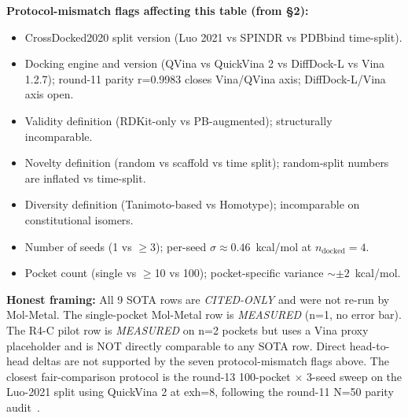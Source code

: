 \begin{table}[t]
\vspace{4pt}
\textbf{Protocol-mismatch flags affecting this table (from \S2):}
\begin{itemize}\setlength{\itemsep}{0pt}
  \item[(M1)] CrossDocked2020 split version (Luo 2021 vs SPINDR vs PDBbind time-split).
  \item[(M2)] Docking engine and version (QVina vs QuickVina 2 vs DiffDock-L vs Vina 1.2.7); round-11 parity r=0.9983 closes Vina/QVina axis; DiffDock-L/Vina axis open.
  \item[(M3)] Validity definition (RDKit-only vs PB-augmented); structurally incomparable.
  \item[(M4)] Novelty definition (random vs scaffold vs time split); random-split numbers are inflated vs time-split.
  \item[(M5)] Diversity definition (Tanimoto-based vs Homotype); incomparable on constitutional isomers.
  \item[(M6)] Number of seeds (1 vs $\geq$3); per-seed $\sigma \approx 0.46$~kcal/mol at $n_{\text{docked}}=4$.
  \item[(M7)] Pocket count (single vs $\geq$10 vs 100); pocket-specific variance $\sim \pm 2$~kcal/mol.
\end{itemize}

\vspace{2pt}
\textbf{Honest framing:} All 9 SOTA rows are \emph{CITED-ONLY} and were not re-run by Mol-Metal. The single-pocket Mol-Metal row is \emph{MEASURED} (n=1, no error bar). The R4-C pilot row is \emph{MEASURED} on n=2 pockets but uses a Vina proxy placeholder and is NOT directly comparable to any SOTA row. Direct head-to-head deltas are not supported by the seven protocol-mismatch flags above. The closest fair-comparison protocol is the round-13 100-pocket $\times$ 3-seed sweep on the Luo-2021 split using QuickVina 2 at exh=8, following the round-11 N=50 parity audit~\cite{footnote:round11_parity}.
\end{table}
